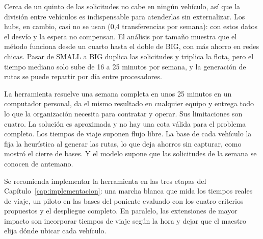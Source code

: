  Cerca de un quinto de las solicitudes no cabe en ningún vehículo, así que la división entre vehículos es indispensable para atenderlas sin externalizar. Los hubs, en cambio, casi no se usan (0,4 transferencias por semana): con estos datos el desvío y la espera no compensan. El análisis por tamaño muestra que el método funciona desde un cuarto hasta el doble de BIG, con más ahorro en redes chicas. Pasar de SMALL a BIG duplica las solicitudes y triplica la flota, pero el tiempo mediano solo sube de 16 a 25 minutos por semana, y la generación de rutas se puede repartir por día entre procesadores.

 La herramienta resuelve una semana completa en unos 25 minutos en un computador personal, da el mismo resultado en cualquier equipo y entrega todo lo que la organización necesita para contratar y operar. Sus limitaciones son cuatro. La solución es aproximada y no hay una cota válida para el problema completo. Los tiempos de viaje suponen flujo libre. La base de cada vehículo la fija la heurística al generar las rutas, lo que deja ahorros sin capturar, como mostró el cierre de bases. Y el modelo supone que las solicitudes de la semana se conocen de antemano.

 Se recomienda implementar la herramienta en las tres etapas del Capítulo~\ref{cap:implementacion}: una marcha blanca que mida los tiempos reales de viaje, un piloto en las bases del poniente evaluado con los cuatro criterios propuestos y el despliegue completo. En paralelo, las extensiones de mayor impacto son incorporar tiempos de viaje según la hora y dejar que el maestro elija dónde ubicar cada vehículo.
